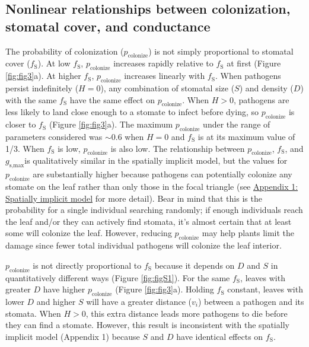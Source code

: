 \documentclass[utf8]{frontiersSCNS}
\newcommand{\fs}{$f_\text{S}$}
\newcommand{\gsmax}{$g_\text{s,max}$}
\begin{document}
\hypertarget{nonlinear-relationships-between-colonization-stomatal-cover-and-conductance}{%
\subsection*{Nonlinear relationships between colonization, stomatal
cover, and
conductance}\label{nonlinear-relationships-between-colonization-stomatal-cover-and-conductance}}

The probability of colonization (\(p_\text{colonize}\)) is not simply
proportional to stomatal cover (\fs). At low \fs, \(p_\text{colonize}\)
increases rapidly relative to \fs{} at first (Figure \ref{fig:fig3}a).
At higher \fs, \(p_\text{colonize}\) increases linearly with \fs. When
pathogens persist indefinitely (\(H = 0\)), any combination of stomatal
size (\(S\)) and density (\(D\)) with the same \fs{} have the same
effect on \(p_\text{colonize}\). When \(H > 0\), pathogens are less
likely to land close enough to a stomate to infect before dying, so
\(p_\text{colonize}\) is closer to \fs{} (Figure \ref{fig:fig3}a). The
maximum \(p_\text{colonize}\) under the range of parameters considered
was \(\sim 0.6\) when \(H = 0\) and \fs{} is at its maximum value of
1/3. When \fs{} is low, \(p_\text{colonize}\) is also low. The
relationship between \(p_\text{colonize}\), \fs, and \gsmax is
qualitatively similar in the spatially implicit model, but the values
for \(p_\text{colonize}\) are substantially higher because pathogens can
potentially colonize any stomate on the leaf rather than only those in
the focal triangle (see
\protect\hyperlink{appendix-1-spatially-implicit-model}{Appendix 1:
Spatially implicit model} for more detail). Bear in mind that this is
the probability for a single individual searching randomly; if enough
individuals reach the leaf and/or they can actively find stomata, it's
almost certain that at least some will colonize the leaf. However,
reducing \(p_\text{colonize}\) may help plants limit the damage since
fewer total individual pathogens will colonize the leaf interior.

\(p_\text{colonize}\) is not directly proportional to \fs{} because it
depends on \(D\) and \(S\) in quantitatively different ways (Figure
\ref{fig:figS1}). For the same \fs, leaves with greater \(D\) have
higher \(p_\text{colonize}\) (Figure \ref{fig:fig3}a). Holding \fs{}
constant, leaves with lower \(D\) and higher \(S\) will have a greater
distance (\(v_i\)) between a pathogen and its stomata. When \(H > 0\),
this extra distance leads more pathogens to die before they can find a
stomate. However, this result is inconsistent with the spatially
implicit model (Appendix 1) because \(S\) and \(D\) have identical
effects on \fs.
\end{document}
